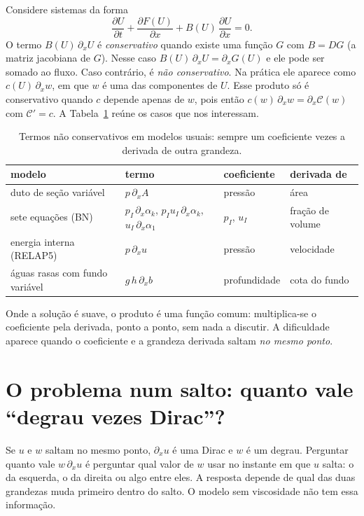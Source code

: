\documentclass[11pt,a4paper]{article}
\theoremstyle{definition}
\theoremstyle{remark}
\newcommand{\pd}[2]{\frac{\partial #1}{\partial #2}}
\begin{document}
Considere sistemas da forma
\begin{equation}\label{eq:sistema}
\pd{U}{t}+\pd{F(U)}{x}+B(U)\,\pd{U}{x}=0 .
\end{equation}
O termo $B(U)\,\partial_x U$ é \emph{conservativo} quando existe uma função $G$ com $B=DG$ (a matriz jacobiana de $G$). Nesse caso $B(U)\,\partial_xU=\partial_x G(U)$ e ele pode ser somado ao fluxo. Caso contrário, é \emph{não conservativo}. Na prática ele aparece como $c(U)\,\partial_x w$, em que $w$ é uma das componentes de $U$. Esse produto só é conservativo quando $c$ depende apenas de $w$, pois então $c(w)\,\partial_xw=\partial_x\mathcal C(w)$ com $\mathcal C'=c$. A Tabela~\ref{tab:exemplos} reúne os casos que nos interessam.

\begin{table}[h]
\centering\small
\caption{Termos não conservativos em modelos usuais: sempre um coeficiente vezes a derivada de outra grandeza.}\label{tab:exemplos}
\begin{tabular}{@{}llll@{}}
\toprule
modelo & termo & coeficiente & derivada de\\
\midrule
duto de seção variável & $p\,\partial_xA$ & pressão & área\\
sete equações (BN) & $p_I\,\partial_x\alpha_k$, $p_Iu_I\,\partial_x\alpha_k$, $u_I\,\partial_x\alpha_1$ & $p_I$, $u_I$ & fração de volume\\
energia interna (RELAP5) & $p\,\partial_xu$ & pressão & velocidade\\
águas rasas com fundo variável & $g\,h\,\partial_xb$ & profundidade & cota do fundo\\
\bottomrule
\end{tabular}
\end{table}

Onde a solução é suave, o produto é uma função comum: multiplica-se o coeficiente pela derivada, ponto a ponto, sem nada a discutir. A dificuldade aparece quando o coeficiente e a grandeza derivada saltam \emph{no mesmo ponto}.

\section{O problema num salto: quanto vale ``degrau vezes Dirac''?}

\begin{intuicao}
Se $u$ e $w$ saltam no mesmo ponto, $\partial_x u$ é uma Dirac e $w$ é um degrau. Perguntar quanto vale $w\,\partial_xu$ é perguntar qual valor de $w$ usar no instante em que $u$ salta: o da esquerda, o da direita ou algo entre eles. A resposta depende de qual das duas grandezas muda primeiro dentro do salto. O modelo sem viscosidade não tem essa informação.
\end{intuicao}
\end{document}
